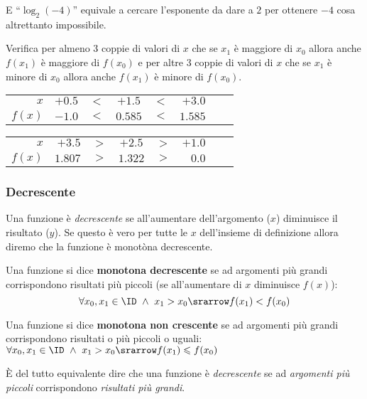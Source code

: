 E ``\(\log_2{(-4)}\)'' equivale a cercare l'esponente da dare a \(2\) per 
ottenere \(-4\) cosa altrettanto impossibile.

\begin{esempio}
Verifica per almeno 3 coppie di valori di \(x\) che se \(x_1\) è maggiore di 
\(x_0\) allora anche  \(f(x_1)\) è maggiore di \(f(x_0)\) 
e per altre 3 coppie di valori di \(x\) che se \(x_1\) è minore di \(x_0\) 
allora anche  \(f(x_1)\) è minore di \(f(x_0)\).
\begin{center}
\begin{tabular}{rrrccrcr}
\hline
\(x\)    & \(+0.5\) & \(<\) & \(+1.5\)  & \(<\) & \(+3.0\) \\
\(f(x)\) & \(-1.0\) & \(<\) & \(0.585\) & \(<\) & \(1.585\) \\
\hline
\end{tabular}
\hspace{15mm}
\begin{tabular}{rrrccrcr}
\hline
\(x\)    & \(+3.5\)  & \(>\) & \(+2.5\)  & \(>\) & \(+1.0\) \\
\(f(x)\) & \(1.807\) & \(>\) & \(1.322\) & \(>\) & \(0.0\) \\
\hline
\end{tabular}
\end{center}
\end{esempio}

\subsubsection{Decrescente}

Una funzione è \emph{decrescente} se all'aumentare dell'argomento (\(x\)) 
diminuisce il risultato (\(y\)). Se questo è vero per tutte le \(x\) 
dell'insieme di definizione allora diremo che la funzione è monotòna 
decrescente.

\begin{definizione}
Una funzione si dice \textbf{monotona decrescente} se ad argomenti più grandi 
corrispondono risultati più piccoli (se all'aumentare di \(x\) diminuisce 
\(f(x)\)):
\[\forall x_0, x_1 \in \ID ~\land~ x_1 > x_0 \srarrow f(x_1) < f(x_0)\]

Una funzione si dice \textbf{monotona non crescente} se ad argomenti più 
grandi corrispondono risultati o più piccoli o uguali: \quad 
\(\forall x_0, x_1 \in \ID ~\land~ x_1 > x_0 \srarrow 
f(x_1) \leqslant f(x_0)\)
\end{definizione}

È del tutto equivalente dire che una funzione è \emph{decrescente} se ad 
\emph{argomenti più piccoli} corrispondono \emph{risultati più grandi}.

